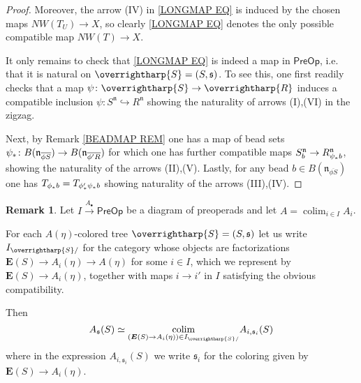\documentclass[a4paper,10pt
,draft
]{article}%
\numberwithin{equation}{section}
\numberwithin{figure}{section}
\theoremstyle{definition} %
\newtheorem{remark}[equation]{Remark}%
\newcommand{\vect}[1]{\text{\overrightharp{\ensuremath{#1}}}}
\DeclareMathOperator{\colim}{colim}%
\newcommand{\1}{\ensuremath{\mathbbm 1}}%
\begin{document}
\begin{proof}
	Moreover, the arrow (IV) in \eqref{LONGMAP EQ}
	is induced by the chosen maps
	$NW(T_U) \to X$,
	so clearly 
	\eqref{LONGMAP EQ}
	denotes the only possible compatible map
	$NW(T) \to X$.

	It only remains to check that
	\eqref{LONGMAP EQ}
	is indeed a map in 
	$\mathsf{PreOp}$, i.e. that it is natural on 
	$\vect{S}=(S,\mathfrak{s})$.
	To see this, one first readily checks that a map
	$\psi \colon \vect{S} \to \vect{R}$
	induces a compatible inclusion
	$\psi \colon S^{\mathfrak{n}} \hookrightarrow R^{\mathfrak{n}}$
	showing the naturality of arrows (I),(VI) 
	in the zigzag.

	Next, by Remark \ref{BEADMAP REM}
	one has a map of bead sets
	$\psi_{\**} \colon 
	B(\mathfrak{n}_{\overline{\phi S}})
	\to
	B(\mathfrak{n}_{\overline{\phi' R}})$
	for which one has further compatible maps
	$S^{\mathfrak{n}}_b
	\to 
	R^{\mathfrak{n}}_{\psi_{\**}b}$,
	showing the naturality of the arrows (II),(V).
	Lastly, for any bead 
	$b \in B(\mathfrak{n}_{\overline{\phi S}})$
	one has
	$T_{\phi_{\**}b} = T_{\phi'_{\**} \psi_{\**}b}$
	showing naturality of the arrows (III),(IV).
\end{proof}





\begin{remark}\label{PREOPCOLEV REM}
	Let $I \xrightarrow{A_{\bullet}} \mathsf{PreOp}$
	be a diagram of preoperads and let
	$A = \colim_{i \in I} A_i$.
	
	For each $A(\eta)$-colored tree 
	$\vect{S} = (S,\mathfrak{s})$
	let us write
	$I_{\vect{S}/}$
	for the category whose objects are factorizations
	$\boldsymbol{E}(S) \to A_i(\eta) \to A(\eta)$ 
	for some $i \in I$,
	which we represent by 
	$\boldsymbol{E}(S) \to A_i(\eta)$,
	together with maps $i \to i'$ in $I$
	satisfying the obvious compatibility.
	
	Then
\begin{equation}\label{COLIMALT EQ}
	A_{\mathfrak{s}}(S) \simeq 
	\underset{(\boldsymbol{E}(S) \to A_i(\eta)) \in I_{\vect{S}/}}{\colim}
	A_{i,
	\mathfrak{s}_i}(S)
\end{equation}
	where in the expression 
	$A_{i,\mathfrak{s}_i}(S)$
	we write 
	$\mathfrak{s}_i$
	for the coloring given by
	$\boldsymbol{E}(S) \to A_i(\eta)$.
\end{remark}
\end{document}
